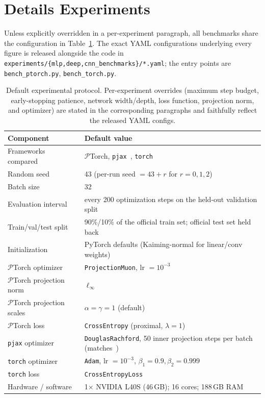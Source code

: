 \documentclass{article}
\begin{document}
\section{Details Experiments}
Unless explicitly overridden in a per-experiment paragraph, all benchmarks share the configuration in
Table~\ref{tab:shared-protocol}. The exact YAML configurations underlying every figure is released alongside the code in
\texttt{experiments/\{mlp,deep,cnn\_benchmarks\}/*.yaml}; the entry
points are \texttt{bench\_ptorch.py}, \texttt{bench\_torch.py}.
\begin{table}[h]
\centering
\caption{Default experimental protocol. Per-experiment overrides
(maximum step budget, early-stopping patience, network width/depth,
loss function, projection norm, and optimizer) are stated in the
corresponding paragraphs and faithfully reflect the released YAML
configs.}
\small
\renewcommand{\arraystretch}{1.0}
\begin{tabular}{ll}
\toprule
\textbf{Component} & \textbf{Default value} \\
\midrule
Frameworks compared      & $\mathcal{P}$Torch, \texttt{pjax}~\cite{bergmeister2025projection}, \texttt{torch}~\cite{paszke2019pytorchimperativestylehighperformance} \\
Random seed              & 43 (per-run seed $= 43 + r$ for $r=0,1,2$) \\
Batch size               & 32 \\
Evaluation interval      & every 200 optimization steps on the held-out validation split \\
Train/val/test split     & 90\%/10\% of the official train set; official test set held back \\
Initialization           & PyTorch defaults (Kaiming-normal for linear/conv weights) \\
$\mathcal{P}$Torch optimizer  & \texttt{ProjectionMuon}, lr $=10^{-3}$ \\
$\mathcal{P}$Torch projection norm & $\ell_\infty$ \\
$\mathcal{P}$Torch projection scales & $\alpha = \gamma = 1$ (default) \\
$\mathcal{P}$Torch loss       & \texttt{CrossEntropy} (proximal, $\lambda=1$) \\
\texttt{pjax} optimizer  & \texttt{DouglasRachford}, 50 inner projection steps per batch (matches~\cite{bergmeister2025projection}) \\
\texttt{torch} optimizer & \texttt{Adam}, lr $=10^{-3}$, $\beta_1{=}0.9,\beta_2{=}0.999$ \\
\texttt{torch} loss      & \texttt{CrossEntropyLoss} \\
Hardware / software      & 1$\times$ NVIDIA L40S (46\,GB); 16 cores; 188\,GB RAM\\
\bottomrule
\end{tabular}
\label{tab:shared-protocol}
\end{table}
\end{document}
